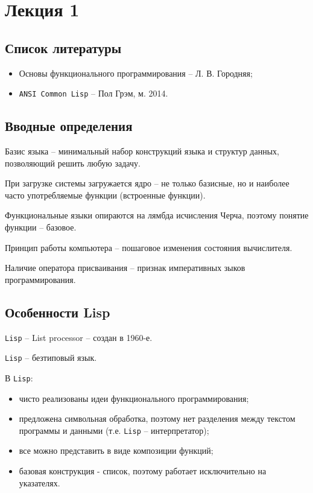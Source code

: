 \chapter{Лекция 1}

\section{Список литературы}

\begin{itemize}
    \item Основы функционального программирования -- Л. В. Городняя;
    \item \texttt{ANSI Common Lisp} -- Пол Грэм, м. 2014.
\end{itemize}

\section{Вводные определения}

Базис языка -- минимальный набор конструкций языка и структур данных, позволяющий решить любую задачу.

При загрузке системы загружается ядро -- не только базисные, но и наиболее часто употребляемые функции (встроенные функции).

Функциональные языки опираются на лямбда исчисления Черча, поэтому понятие функции -- базовое.

Принцип работы компьютера -- пошаговое изменения состояния вычислителя.

Наличие оператора присваивания -- признак императивных зыков программирования.

\section{Особенности Lisp}

\texttt{Lisp} -- List processor -- создан в 1960-е.

\texttt{Lisp} -- безтиповый язык.

В \texttt{Lisp}:
\begin{itemize}
    \item чисто реализованы идеи функционального программирования;
    \item предложена символьная обработка, поэтому нет разделения между текстом программы и данными (т.е. \texttt{Lisp} -- интерпретатор);
    \item все можно представить в виде композиции функций;
    \item базовая конструкция - список, поэтому работает исключительно на указателях.
\end{itemize}

